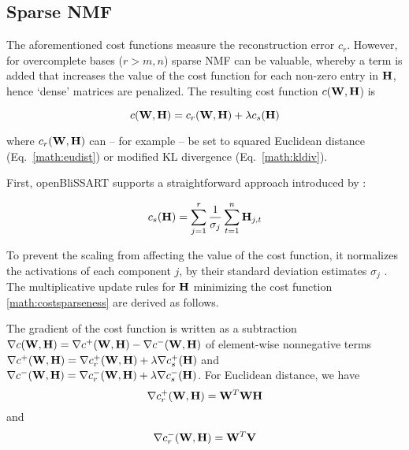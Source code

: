 \subsection{Sparse NMF}
\label{sec:sparseness}

The aforementioned cost functions measure the reconstruction error $c_r$.
However, for overcomplete bases (\ie $r > m,n$) sparse NMF \cite{Hoyer2002,Hoyer2004,Eggert2004,Schmidt2006,Virtanen2007} can be valuable, whereby a term is added that increases the value of the cost function for each non-zero entry in
$\mathbf{H}$, hence `dense' matrices are penalized. The resulting cost function
$c(\mathbf{W},\mathbf{H}$) is

\begin{equation}
    \label{math:costsparseness}
    c(\mathbf{W},\mathbf{H}) = c_r(\mathbf{W},\mathbf{H}) + \lambda c_s(\mathbf{H})
\end{equation}

\noindent where $c_r(\mathbf{W},\mathbf{H})$ can -- for example -- be set to squared
Euclidean distance (Eq.~\ref{math:eudist}) or modified KL divergence
(Eq.~\ref{math:kldiv}).

First, openBliSSART supports a straightforward approach introduced by \cite{Virtanen2007}:

\begin{equation}
    \label{math:sparseness} 
    c_s(\mathbf{H}) = \sum\limits_{j=1}^r \frac{1}{\sigma_j} \sum\limits_{t=1}^n \mathbf{H}_{j,t}
\end{equation}

To prevent the scaling from affecting the value of the cost
function, it normalizes the activations of each component $j$, \eg
by their standard deviation estimates $\sigma_j$ \cite{Virtanen2007}. The multiplicative update rules for $\mathbf{H}$ minimizing the cost function \ref{math:costsparseness} are derived as follows. 

The gradient of the cost function is written as a subtraction $\nabla c(\mathbf{W},\mathbf{H}) = \nabla c^+ (\mathbf{W},\mathbf{H}) - \nabla c^- (\mathbf{W},\mathbf{H})$ of element-wise nonnegative terms $\nabla c^+(\mathbf{W},\mathbf{H}) = \nabla c_r^+(\mathbf{W},\mathbf{H}) + \lambda \nabla c_s^+(\mathbf{H})$ and $\nabla c^-(\mathbf{W},\mathbf{H}) = \nabla c_r^-(\mathbf{W},\mathbf{H}) + \lambda \nabla c_s^-(\mathbf{H})$.
For Euclidean distance, we have 
\begin{equation}
\nabla c_r^+(\mathbf{W},\mathbf{H}) = \mathbf{W}^T\mathbf{WH}
\end{equation}
and
\begin{equation}
\nabla c_r^-(\mathbf{W},\mathbf{H}) = \mathbf{W}^T\mathbf{V}
\end{equation}

